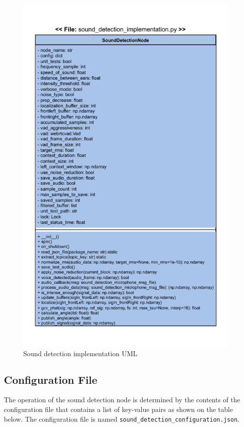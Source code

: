 \documentclass{CSSRforAfrica}
\begin{document}
\begin{figure}[!hbpt]
	\centering
	\includegraphics[scale=1.0]{images/Sound_implementation_UML.pdf}
	\caption{Sound detection implementation UML}
	\label{fig:sound_implementation_UML}
\end{figure}

\newpage 


\subsection*{Configuration File}
The operation of the sound detection node is determined by the contents of the configuration file that contains a list of key-value pairs as shown on the table below. 
The configuration file is named \texttt{sound\_detection\_configuration.json}. 
\end{document}
